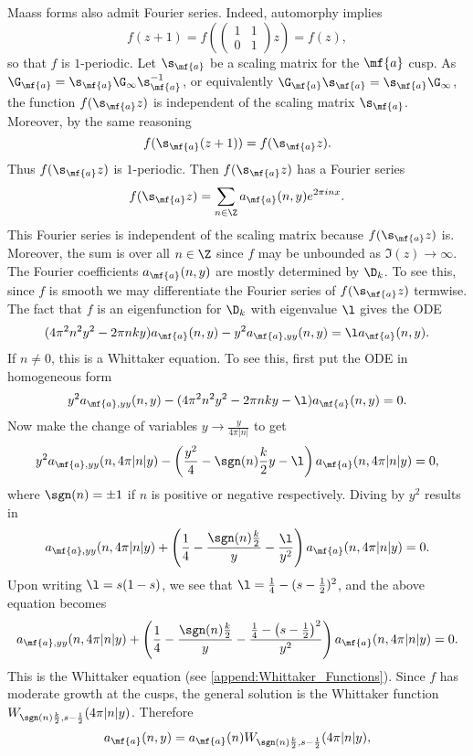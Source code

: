     Maass forms also admit Fourier series. Indeed, automorphy implies
    \[
      f(z+1) = f\left(\begin{pmatrix} 1 & 1 \\ 0 & 1 \end{pmatrix}z\right) = f(z),
    \]
    so that $f$ is $1$-periodic. Let $\s_{\mf{a}}$ be a scaling matrix for the $\mf{a}$ cusp. As $\G_{\mf{a}} = \s_{\mf{a}}\G_{\infty}\s_{\mf{a}}^{-1}$, or equivalently $\G_{\mf{a}}\s_{\mf{a}} = \s_{\mf{a}}\G_{\infty}$, the function $f(\s_{\mf{a}}z)$ is independent of the scaling matrix $\s_{\mf{a}}$. Moreover, by the same reasoning
    \[
      f(\s_{\mf{a}}(z+1)) = f(\s_{\mf{a}}z).
    \]
    Thus $f(\s_{\mf{a}}z)$ is $1$-periodic. Then $f(\s_{\mf{a}}z)$ has a Fourier series
    \[
      f(\s_{\mf{a}}z) = \sum_{n \in \Z}a_{\mf{a}}(n,y)e^{2\pi inx}.
    \]
    This Fourier series is independent of the scaling matrix because $f(\s_{\mf{a}}z)$ is. Moreover, the sum is over all $n \in \Z$ since $f$ may be unbounded as $\Im(z) \to \infty$. The Fourier coefficients $a_{\mf{a}}(n,y)$ are mostly determined by $\D_{k}$. To see this, since $f$ is smooth we may differentiate the Fourier series of $f(\s_{\mf{a}}z)$ termwise. The fact that $f$ is an eigenfunction for $\D_{k}$ with eigenvalue $\l$ gives the ODE
    \[
      (4\pi^{2}n^{2}y^{2}-2\pi nky)a_{\mf{a}}(n,y)-y^{2}a_{\mf{a},yy}(n,y) = \l a_{\mf{a}}(n,y).
    \]
    If $n \neq 0$, this is a Whittaker equation. To see this, first put the ODE in homogeneous form
    \[
      y^{2}a_{\mf{a},yy}(n,y)-(4\pi^{2}n^{2}y^{2}-2\pi nky-\l)a_{\mf{a}}(n,y) = 0.
    \]
    Now make the change of variables $y \to \frac{y}{4\pi|n|}$ to get
    \[
      y^{2}a_{\mf{a},yy}(n,4\pi|n|y)-\left(\frac{y^{2}}{4}-\sgn(n)\frac{k}{2}y-\l\right)a_{\mf{a}}(n,4\pi|n|y) = 0,
    \]
    where $\sgn(n) = \pm1$ if $n$ is positive or negative respectively. Diving by $y^{2}$ results in
    \[
      a_{\mf{a},yy}(n,4\pi|n|y)+\left(\frac{1}{4}-\frac{\sgn(n)\frac{k}{2}}{y}-\frac{\l}{y^{2}}\right)a_{\mf{a}}(n,4\pi|n|y) = 0.
    \]
    Upon writing $\l = s(1-s)$, we see that $\l = \frac{1}{4}-(s-\frac{1}{2})^{2}$, and the above equation becomes
    \[
      a_{\mf{a},yy}(n,4\pi|n|y)+\left(\frac{1}{4}-\frac{\sgn(n)\frac{k}{2}}{y}-\frac{\frac{1}{4}-\left(s-\frac{1}{2}\right)^{2}}{y^{2}}\right)a_{\mf{a}}(n,4\pi|n|y) = 0.
    \]
    This is the Whittaker equation (see \cref{append:Whittaker_Functions}). Since $f$ has moderate growth at the cusps, the general solution is the Whittaker function $W_{\sgn(n)\frac{k}{2},s-\frac{1}{2}}(4\pi|n|y)$. Therefore
    \[
      a_{\mf{a}}(n,y) = a_{\mf{a}}(n)W_{\sgn(n)\frac{k}{2},s-\frac{1}{2}}(4\pi|n|y),
    \]
